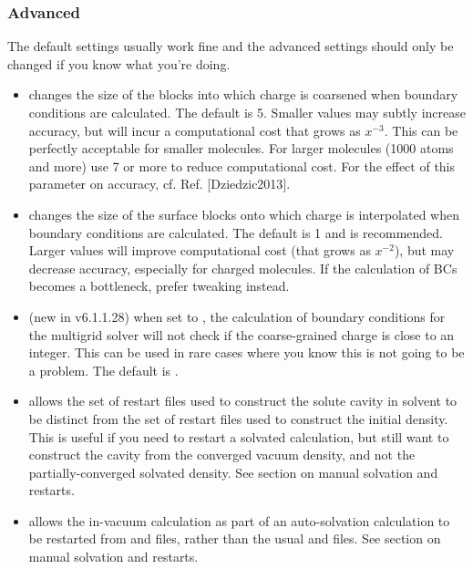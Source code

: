 \documentclass[letterpaper,10pt,english]{sphinxmanual}
\begin{document}
\subsubsection{Advanced}
\label{\detokenize{implicit_solvation_v3:advanced}}
The default settings usually work fine and the advanced settings should
only be changed if you know what you’re doing.
\begin{itemize}
\item {} 
 changes the size of the blocks into which
charge is coarsened when boundary conditions are calculated. The
default is 5. Smaller values may subtly increase accuracy, but will
incur a computational cost that grows as \(x^{-3}\). This can be
perfectly acceptable for smaller molecules. For larger molecules
(1000 atoms and more) use 7 or more to reduce computational cost. For
the effect of this parameter on accuracy, cf. Ref. {[}Dziedzic2013{]}.

\item {} 
 changes the size of the surface
blocks onto which charge is interpolated when boundary conditions are
calculated. The default is 1 and is recommended. Larger values will
improve computational cost (that grows as \(x^{-2}\)), but may
decrease accuracy, especially for charged molecules. If the
calculation of BCs becomes a bottleneck, prefer tweaking
 instead.

\item {} 
 (new in v6.1.1.28) when set to ,
the calculation of boundary conditions for the multigrid solver will
not check if the coarse-grained charge is close to an integer. This
can be used in rare cases where you know this is not going to be a
problem. The default is .

\item {} 
 allows the set of restart files
used to construct the solute cavity in solvent to be distinct from
the set of restart files used to construct the initial density. This
is useful if you need to restart a solvated calculation, but still
want to construct the cavity from the converged vacuum density, and
not the partially-converged solvated density.
See section on manual solvation and restarts.

\item {} 
 allows the in-vacuum calculation as
part of an auto-solvation calculation to be restarted from
 and  files, rather than the
usual  and  files.
See section on manual solvation and restarts.


\end{itemize}
\end{document}
